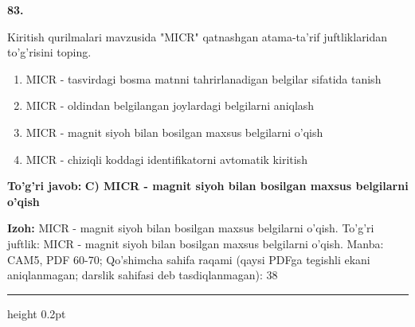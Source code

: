 \documentclass[10pt,a4paper]{article}
\begin{document}
{\bfseries\sffamily\color{ink} 83.}
\par
Kiritish qurilmalari mavzusida "MICR" qatnashgan atama-ta'rif juftliklaridan to'g'risini toping.
\begin{enumerate}[label=\Alph*),leftmargin=9mm]
\item MICR - tasvirdagi bosma matnni tahrirlanadigan belgilar sifatida tanish
\item MICR - oldindan belgilangan joylardagi belgilarni aniqlash
\item MICR - magnit siyoh bilan bosilgan maxsus belgilarni o'qish
\item MICR - chiziqli koddagi identifikatorni avtomatik kiritish
\end{enumerate}
\begin{tcolorbox}[enhanced,breakable,colback=teal!4,colframe=teal!60!black,boxrule=0.45pt,arc=1.2mm,left=2.7mm,right=2.7mm,top=1.8mm,bottom=1.8mm,before skip=2mm,after skip=2mm]
{\bfseries\sffamily\color{teal}To'g'ri javob:} \textbf{C) MICR - magnit siyoh bilan bosilgan maxsus belgilarni o'qish}
\par\smallskip
{\bfseries Izoh:} MICR - magnit siyoh bilan bosilgan maxsus belgilarni o'qish. To'g'ri juftlik: MICR - magnit siyoh bilan bosilgan maxsus belgilarni o'qish. Manba: CAM5, PDF 60-70; Qo'shimcha sahifa raqami (qaysi PDFga tegishli ekani aniqlanmagan; darslik sahifasi deb tasdiqlanmagan): 38
\end{tcolorbox}
\vspace{2mm}\hrule height 0.2pt\vspace{3mm}
\end{document}
